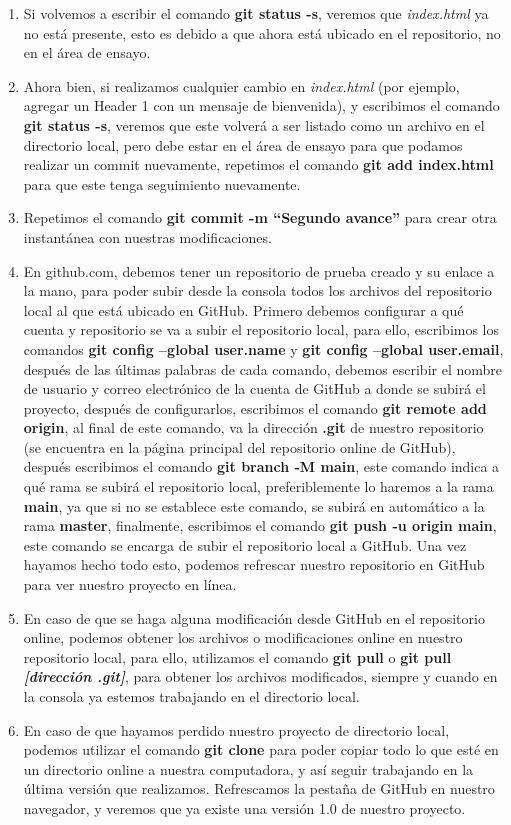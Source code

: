 \begin{enumerate}
    \item Si volvemos a escribir el comando \textbf{git status -s}, veremos que \textit{index.html} ya no está presente, esto es debido a que ahora está ubicado en el repositorio, no en el área de ensayo.
    \item Ahora bien, si realizamos cualquier cambio en \textit{index.html} (por ejemplo, agregar un Header 1 con un mensaje de bienvenida), y escribimos el comando \textbf{git status -s}, veremos que este volverá a ser listado como un archivo en el directorio local, pero debe estar en el área de ensayo para que podamos realizar un commit nuevamente, repetimos el comando \textbf{git add index.html} para que este tenga seguimiento nuevamente.
    \item Repetimos el comando \textbf{git commit -m “Segundo avance”} para crear otra instantánea con nuestras modificaciones.
    \item En github.com, debemos tener un repositorio de prueba creado y su enlace a la mano, para poder subir desde la consola todos los archivos del repositorio local al que está ubicado en GitHub. Primero debemos configurar a qué cuenta y repositorio se va a subir el repositorio local, para ello, escribimos los comandos \textbf{git config –global user.name} y \textbf{git config –global user.email}, después de las últimas palabras de cada comando, debemos escribir el nombre de usuario y correo electrónico de la cuenta de GitHub a donde se subirá el proyecto, después de configurarlos, escribimos el comando \textbf{git remote add origin}, al final de este comando, va la dirección \textbf{.git} de nuestro repositorio (se encuentra en la página principal del repositorio online de GitHub), después escribimos el comando \textbf{git branch -M main}, este comando indica a qué rama se subirá el repositorio local, preferiblemente lo haremos a la rama \textbf{main}, ya que si no se establece este comando, se subirá en automático a la rama \textbf{master}, finalmente, escribimos el comando \textbf{git push -u origin main}, este comando se encarga de subir el repositorio local a GitHub. Una vez hayamos hecho todo esto, podemos refrescar nuestro repositorio en GitHub para ver nuestro proyecto en línea.
    \item En caso de que se haga alguna modificación desde GitHub en el repositorio online, podemos obtener los archivos o modificaciones online en nuestro repositorio local, para ello, utilizamos el comando \textbf{git pull} o \textbf{git pull \textit{[dirección .git]}}, para obtener los archivos modificados, siempre y cuando en la consola ya estemos trabajando en el directorio local.
    \item En caso de que hayamos perdido nuestro proyecto de directorio local, podemos utilizar el comando \textbf{git clone} para poder copiar todo lo que esté en un directorio online a nuestra computadora, y así seguir trabajando en la última versión que realizamos. Refrescamos la pestaña de GitHub en nuestro navegador, y veremos que ya existe una versión 1.0 de nuestro proyecto.
\end{enumerate}



